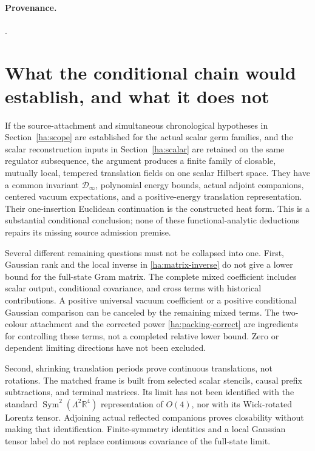\paragraph{Provenance.}
.

\section{What the conditional chain would establish, and what it does not}
\label{ha:identification}

If the source-attachment and simultaneous chronological hypotheses in
Section~\ref{ha:scope} are established for the actual scalar germ families,
and the scalar reconstruction inputs in Section~\ref{ha:scalar} are
retained on the same regulator subsequence, the argument produces a
finite family of closable, mutually local, tempered translation fields
on one scalar Hilbert space.  They have a common invariant
$\mathcal D_\infty$, polynomial energy bounds, actual adjoint companions,
centered vacuum expectations, and a positive-energy translation
representation.  Their one-insertion Euclidean continuation is the
constructed heat form.  This is a substantial conditional conclusion;
none of these functional-analytic deductions repairs its missing source
admission premise.

Several different remaining questions must not be collapsed into one.
First, Gaussian rank and the local inverse in
\eqref{ha:matrix-inverse} do not give a lower bound for the full-state
Gram matrix.  The complete mixed coefficient includes scalar output,
conditional covariance, and cross terms with historical contributions.
A positive universal vacuum coefficient or a positive conditional
Gaussian comparison can be canceled by the remaining mixed terms.
The two-colour attachment and the corrected power
\eqref{ha:packing-correct} are ingredients for controlling these terms,
not a completed relative lower bound.  Zero or dependent limiting
directions have not been excluded.

Second, shrinking translation periods prove continuous translations,
not rotations.  The matched frame is built from selected scalar stencils,
causal prefix subtractions, and terminal matrices.  Its limit has not
been identified with the standard
$\operatorname{Sym}^2(\Lambda^2\mathbb R^4)$ representation of
$O(4)$, nor with its Wick-rotated Lorentz tensor.  Adjoining actual
reflected companions proves closability without making that identification.
Finite-symmetry identities and a local Gaussian tensor label do not
replace continuous covariance of the full-state limit.

